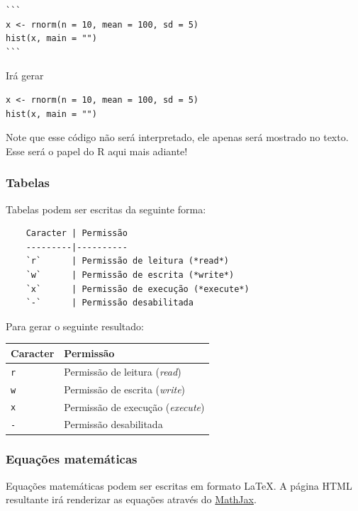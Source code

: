 \documentclass[
  10pt,
  a4paper]{book}
\begin{document}
\begin{verbatim}
```
x <- rnorm(n = 10, mean = 100, sd = 5)
hist(x, main = "")
```
\end{verbatim}

Irá gerar

\begin{verbatim}
x <- rnorm(n = 10, mean = 100, sd = 5)
hist(x, main = "")
\end{verbatim}

Note que esse código não será interpretado, ele apenas será mostrado no
texto. Esse será o papel do R aqui mais adiante!

\hypertarget{tabelas}{%
\subsubsection*{Tabelas}\label{tabelas}}


Tabelas podem ser escritas da seguinte forma:

\begin{verbatim}
    Caracter | Permissão
    ---------|----------
    `r`      | Permissão de leitura (*read*)
    `w`      | Permissão de escrita (*write*)
    `x`      | Permissão de execução (*execute*)
    `-`      | Permissão desabilitada
\end{verbatim}

Para gerar o seguinte resultado:

\begin{longtable}[]{@{}ll@{}}
\toprule()
Caracter & Permissão \\
\midrule()
\endhead
\texttt{r} & Permissão de leitura (\emph{read}) \\
\texttt{w} & Permissão de escrita (\emph{write}) \\
\texttt{x} & Permissão de execução (\emph{execute}) \\
\texttt{-} & Permissão desabilitada \\
\bottomrule()
\end{longtable}

\hypertarget{equauxe7uxf5es-matemuxe1ticas}{%
\subsubsection*{Equações matemáticas}\label{equauxe7uxf5es-matemuxe1ticas}}


Equações matemáticas podem ser escritas em formato LaTeX. A página
HTML resultante irá renderizar as equações através do \href{http://www.mathjax.org}{MathJax}.
\end{document}
